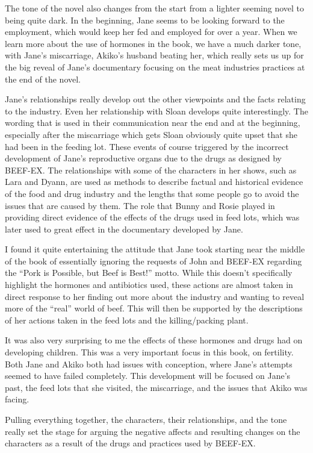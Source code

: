 \documentclass{article}
\begin{document}
The tone of the novel also changes from the start from a lighter seeming
novel to being quite dark. In the beginning, Jane seems to be looking
forward to the employment, which would keep her fed and employed for over a
year. When we learn more about the use of hormones in the book, we have a
much darker tone, with Jane's miscarriage, Akiko's husband beating her,
which really sets us up for the big reveal of Jane's documentary focusing on
the meat industries practices at the end of the novel.

Jane's relationships really develop out the other viewpoints and the facts
relating to the industry. Even her relationship with Sloan develops quite
interestingly. The wording that is used in their communication near the end
and at the beginning, especially after the miscarriage which gets Sloan
obviously quite upset that she had been in the feeding lot. These events of
course triggered by the incorrect development of Jane's reproductive organs
due to the drugs as designed by BEEF-EX. The relationships with some of the
characters in her shows, such as Lara and Dyann, are used as methods to
describe factual and historical evidence of the food and drug industry and
the lengths that some people go to avoid the issues that are caused by them.
The role that Bunny and Rosie played in providing direct evidence of the
effects of the drugs used in feed lots, which was later used to great effect
in the documentary developed by Jane.

I found it quite entertaining the attitude that Jane took starting near the
middle of the book of essentially ignoring the requests of John and BEEF-EX
regarding the ``Pork is Possible, but Beef is Best!'' \cite{ozeki1998my}
motto. While this doesn't specifically highlight the hormones and
antibiotics used, these actions are almost taken in direct response to her
finding out more about the industry and wanting to reveal more of the
``real'' world of beef. This will then be supported by the descriptions of
her actions taken in the feed lots and the killing/packing plant.

It was also very surprising to me the effects of these hormones and drugs
had on developing children. This was a very important focus in this book, on
fertility. Both Jane and Akiko both had issues with conception, where Jane's
attempts seemed to have failed completely. This development will be focused
on Jane's past, the feed lots that she visited, the miscarriage, and the
issues that Akiko was facing.

Pulling everything together, the characters, their relationships, and the
tone really set the stage for arguing the negative affects and resulting
changes on the characters as a result of the drugs and practices used by
BEEF-EX.
\makeworkscited
\end{document}
